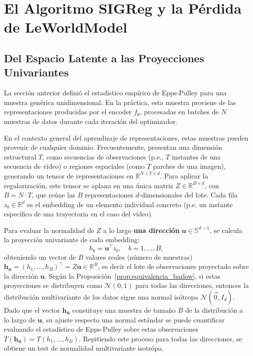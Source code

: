 \section{El Algoritmo SIGReg y la Pérdida de LeWorldModel}
\label{sec:sigreg_algoritmo}

\subsection{Del Espacio Latente a las Proyecciones Univariantes}
La sección anterior definió el estadístico empírico de Epps-Pulley para una muestra genérica unidimensional. En la práctica, esta muestra proviene de las representaciones producidas por el encoder $f_\theta$, procesadas en batches de $N$ muestras de datos durante cada iteración del optimizador.

En el contexto general del aprendizaje de representaciones, estas muestras pueden provenir de cualquier dominio. Frecuentemente, presentan una dimensión estructural $T$, como secuencias de observaciones (p.e., $T$ instantes de una secuencia de vídeo) o regiones espaciales (como $T$ parches de una imagen), generando un tensor de representaciones en $\mathbb{R}^{N \times T \times d}$. Para aplicar la regularización, este tensor se aplana en una única matriz $Z \in \mathbb{R}^{B \times d}$, con $B = N \cdot T$, que reúne las $B$ representaciones $d$-dimensionales del lote. Cada fila $z_b \in \mathbb{R}^d$ es el embedding de un elemento individual concreto (p.e. un instante específico de una trayectoria en el caso del vídeo).

Para evaluar la normalidad de $Z$ a lo largo \textbf{una dirección} $\mathbf{u} \in \mathbb{S}^{d-1}$, se calcula la proyección univariante de cada embedding:
\begin{equation}
h_b = \mathbf{u}^\top z_b, \quad b = 1, \dots, B,
\end{equation}
obteniendo un vector de $B$ valores reales (número de muestras) $\mathbf{h_u} = (h_1, \dots, h_B)^\top = Z\mathbf{u} \in \mathbb{R}^B$, es decir el lote de observaciones proyectado sobre la dirección $\mathbf{u}$. Según la Proposición~\ref{prop:equivalencia_barlow}, si estas proyecciones se distribuyen como $\mathcal{N}(0,1)$ para todas las direcciones, entonces la distribución multivariante de los datos sigue una normal isótropa $\mathcal{N}(\vec{0}, I_d)$. Dado que el vector $\mathbf{h_u}$ constituye una muestra de tamaño $B$ de la distribución a lo largo de $\mathbf{u}$, su ajuste respecto una normal estándar se puede cuantificar evaluando el estadístico de Epps-Pulley sobre estas observaciones $T(\mathbf{h_u}) = T(h_1, \dots, h_B)$. Repitiendo este proceso para todas las direcciones, se obtiene un test de normalidad multivariante isotrópa. 

